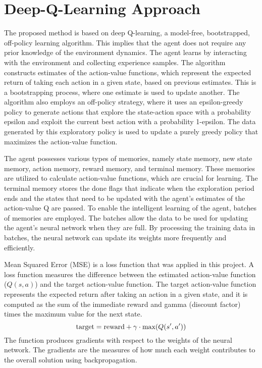 \documentclass[letterpaper]{article} %
\begin{document}
\section{Deep-Q-Learning Approach}
The proposed method is based on deep Q-learning, a model-free, bootstrapped, off-policy learning algorithm. This implies that the agent does not require any prior knowledge of the environment dynamics. The agent learns by interacting with the environment and collecting experience samples. The algorithm constructs estimates of the action-value functions, which represent the expected return of taking each action in a given state, based on previous estimates. This is a bootstrapping process, where one estimate is used to update another. The algorithm also employs an off-policy strategy, where it uses an epsilon-greedy policy to generate actions that explore the state-action space with a probability epsilon and exploit the current best action with a probability 1-epsilon. The data generated by this exploratory policy is used to update a purely greedy policy that maximizes the action-value function.
\par The agent possesses various types of memories, namely state memory, new state memory, action memory, reward memory, and terminal memory. These memories are utilized to calculate action-value functions, which are crucial for learning. The terminal memory stores the done flags that indicate when the exploration period ends and the states that need to be updated with the agent's estimates of the action-value Q are passed. To enable the intelligent learning of the agent, batches of memories are employed. The batches allow the data to be used for updating the agent's neural network when they are full. By processing the training data in batches, the neural network can update its weights more frequently and efficiently.

\par Mean Squared Error (MSE) is a loss function that was applied in this project. A loss function measures the difference between the estimated action-value function ($Q(s, a)$) and the target action-value function. The target action-value function represents the expected return after taking an action in a given state, and it is computed as the sum of the immediate reward and gamma (discount factor) times the maximum value for the next state.
$$
\textnormal{target} = \textnormal{reward} + \gamma \cdot \textnormal{max}(Q(s', a'))
$$
The function produces gradients with respect to the weights of the neural network.
The gradients are the measures of how much each weight contributes to the overall solution using backpropagation.
\end{document}
